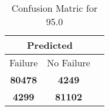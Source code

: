 \begin{table}[] 
\caption{Confusion Matric for 95.0} 
\label{Table: Prediction Accuracy-DMD95.0OnlySunEKF-ignoreReflection-Reflection} 
\centering 
\begin{tabular} 
 {@{}ccc@{}} 
\toprule 
\multicolumn{2}{c}{\textbf{Predicted}}
 \\ \midrule 
\multicolumn{1}{|c|}{Failure} & 
\multicolumn{1}{c|}{No Failure}
 \\ \midrule 
\multicolumn{1}{|c|}{\color{green}\textbf{80478}} & 
\multicolumn{1}{c|}{\color{red}\textbf{4249}}
 \\ \midrule 
\multicolumn{1}{|c|}{\color{red}\textbf{4299}} & 
\multicolumn{1}{c|}{\color{green}\textbf{81102}}
 \\ \bottomrule 
\end{tabular} 
\end{table} 
